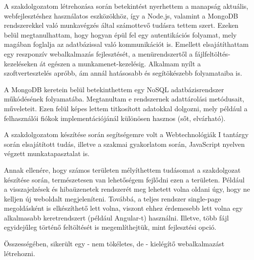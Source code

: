 
A szakdolgozatom létrehozása során betekintést nyerhettem a manapság aktuális, webfejlesztéshez használatos eszközökhöz, így a Node.js, valamint a MongoDB rendszerekkel való munkavégzés által számottevő tudásra tettem szert. Ezeken belül megtanulhattam, hogy hogyan épül fel egy autentikációs folyamat, mely magában foglalja az adatbázissal való kommunikációt is. Emellett elsajátíthattam egy reszponzív webalkalmazás fejlesztését, a menürendszertől a fájlfeltöltés-kezeléseken át egészen a munkamenet-kezelésig. Alkalmam nyílt a szoftvertesztelés apróbb, ám annál hatásosabb és segítökészebb folyamataiba is.

A MongoDB keretein belül betekinthettem egy NoSQL adatbázisrendszer műkódésének folyamatába. Megtanultam e rendszernek adattárolási metódusait, műveleteit. Ezen felül képes lettem titkosított adatokkal dolgozni, mely például a felhasználói fiókok implementációjánál különösen hasznos (sőt, elvárható).

A szakdolgozatom készítése során segítségemre volt a Webtechnológiák I tantárgy során elsajátított tudás, illetve a szakmai gyakorlatom során, JavaScript nyelven végzett munkatapasztalat is.

Annak ellenére, hogy számos területen mélyíthettem tudásomat a szakdolgozat készítése során, természetesen van lehetőségem fejlődni ezen a területen. Például a visszajelzések és hibaüzenetek rendszerét meg lehetett volna oldani úgy, hogy ne kelljen új weboldalt megjeleníteni. Továbbá, a teljes rendszer single-page megoldásként is elkészíthető lett volna, viszont ehhez érdemesebb lett volna egy alkalmasabb keretrendszert (például Angular-t) használni. Illetve, több fájl egyidejűleg történő feltöltését is megemlíthejtük, mint fejlesztési opció.

Összességében, sikerült egy - nem tökéletes, de - kielégítő webalkalmazást létrehozni.